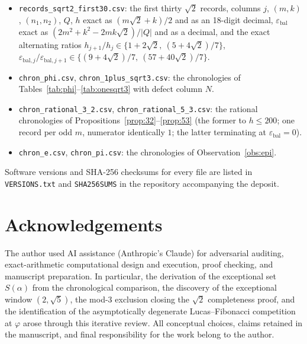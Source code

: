\documentclass[11pt]{article}
\theoremstyle{definition}
\theoremstyle{remark}
\newcommand{\eb}{\varepsilon_{\mathrm{bal}}}
\begin{document}
\begin{itemize}
\item \texttt{records\_sqrt2\_first30.csv}: the first thirty $\sqrt2$ records, columns $j$, $(m,k)$, $(n_1,n_2)$, $Q$, $h$ exact as $(m\sqrt2+k)/2$ and as an 18-digit decimal, $\eb$ exact as $(2m^2+k^2-2mk\sqrt2)/|Q|$ and as a decimal, and the exact alternating ratios $h_{j+1}/h_j\in\{1+2\sqrt2,\ (5+4\sqrt2)/7\}$, $\varepsilon_{\mathrm{bal},j}/\varepsilon_{\mathrm{bal},j+1}\in\{(9+4\sqrt2)/7,\ (57+40\sqrt2)/7\}$.
\item \texttt{chron\_phi.csv}, \texttt{chron\_1plus\_sqrt3.csv}: the chronologies of Tables~\ref{tab:phi}--\ref{tab:onesqrt3} with defect column $N$.
\item \texttt{chron\_rational\_3\_2.csv}, \texttt{chron\_rational\_5\_3.csv}: the rational chronologies of Propositions~\ref{prop:32}--\ref{prop:53} (the former to $h\le200$; one record per odd $m$, numerator identically $1$; the latter terminating at $\eb=0$).
\item \texttt{chron\_e.csv}, \texttt{chron\_pi.csv}: the chronologies of Observation~\ref{obs:epi}.
\end{itemize}

Software versions and SHA-256 checksums for every file are listed in \texttt{VERSIONS.txt} and \texttt{SHA256SUMS} in the repository accompanying the deposit.

\section*{Acknowledgements}

The author used AI assistance (Anthropic's Claude) for adversarial auditing, exact-arithmetic computational design and execution, proof checking, and manuscript preparation. In particular, the derivation of the exceptional set $S(\alpha)$ from the chronological comparison, the discovery of the exceptional window $(2,\sqrt5)$, the mod-$3$ exclusion closing the $\sqrt2$ completeness proof, and the identification of the asymptotically degenerate Lucas--Fibonacci competition at $\varphi$ arose through this iterative review. All conceptual choices, claims retained in the manuscript, and final responsibility for the work belong to the author.
\end{document}
